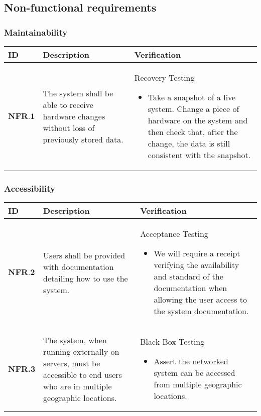 \subsection{Non-functional requirements}

\subsubsection{Maintainability}
\begin{longtable}[H]{|p{1.5cm}|p{4.5cm}|p{10.5cm}|}
    \hline
    \cellcolor{titleColor}\textbf{ID} & \cellcolor{titleColor}\textbf{Description} & \cellcolor{titleColor}\textbf{Verification} \\ \hline
   $ \textbf{NFR.1} $ & The system shall be able to receive hardware changes without loss of previously stored data. & Recovery Testing\begin{itemize}\item Take a snapshot of a live system. Change a piece of hardware on the system and then check that, after the change, the data is still consistent with the snapshot.\end{itemize} \\ \hline
\end{longtable}

\subsubsection{Accessibility}
\begin{longtable}[H]{|p{1.5cm}|p{4.5cm}|p{10.5cm}|}
    \hline
    \cellcolor{titleColor}\textbf{ID} & \cellcolor{titleColor}\textbf{Description} & \cellcolor{titleColor}\textbf{Verification} \\ \hline
    $ \textbf{NFR.2} $ & Users shall be provided with documentation detailing how to use the system. & Acceptance Testing\begin{itemize}\item We will require a receipt verifying the availability and standard of the documentation when allowing the user access to the system documentation.\end{itemize} \\ \hline
    \textbf{NFR.3} & The system, when running externally on servers, must be accessible to end users who are in multiple geographic locations. & Black Box Testing\begin{itemize}\item Assert the networked system can be accessed from multiple geographic locations.\end{itemize} \\ \hline
\end{longtable}

